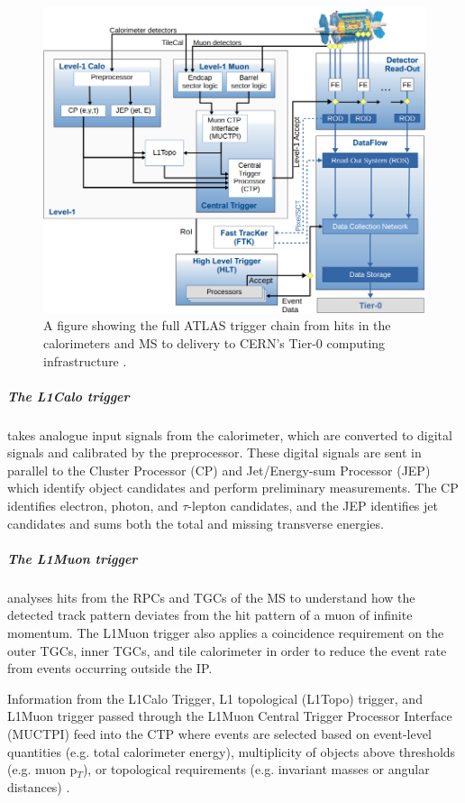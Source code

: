 \documentclass[12pt,a4paper,epsf,portrait,times,epsfig]{article}
\begin{document}
		\begin{figure}
			\centering
			\includegraphics[scale=0.4]{ATLAS_Trigger_Flowchart}
			\caption{A figure showing the full ATLAS trigger chain from hits in the calorimeters and MS to delivery to CERN's Tier-0 computing infrastructure \cite{ATLASTrigger}.}
			\label{Fig:ATLASTriggerChain}
		\end{figure}
		
		\subparagraph{The L1Calo trigger} takes analogue input signals from the calorimeter, which are converted to digital signals and calibrated by the preprocessor. These digital signals are sent in parallel to the Cluster Processor (CP) and Jet/Energy-sum Processor (JEP) which identify object candidates and perform preliminary measurements. The CP identifies electron, photon, and $\tau$-lepton candidates, and the JEP identifies jet candidates and sums both the total and missing transverse energies. \par

		\subparagraph{The L1Muon trigger} analyses hits from the RPCs and TGCs of the MS to understand how the detected track pattern deviates from the hit pattern of a muon of infinite momentum.  The L1Muon trigger also applies a coincidence requirement on the outer TGCs, inner TGCs, and tile calorimeter in order to reduce the event rate from events occurring outside the IP. \par

		Information from the L1Calo Trigger, L1 topological (L1Topo) trigger, and L1Muon trigger passed through the L1Muon Central Trigger Processor Interface (MUCTPI) feed into the CTP where events are selected based on event-level quantities (e.g. total calorimeter energy), multiplicity of objects above thresholds (e.g. muon p$_{T}$), or topological requirements (e.g. invariant masses or angular distances) \cite{ATLASTrigger}. 
		
\end{document}
